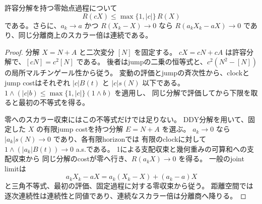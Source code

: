 \begin{lemma}[スカラー倍の連続性]
許容分解を持つ零始点過程について
\[
 R(cX)\le\max\{1,|c|\}\,R(X)
\]
である。さらに、$a_k\to a$ かつ $R(X_k-X)\to0$ なら
$R(a_kX_k-aX)\to0$ であり、同じ分離商上のスカラー倍は連続である。
\end{lemma}
\begin{proof}
分解 $X=N+A$ と二次変分 $[N]$ を固定する。
$cX=cN+cA$ は許容分解で、$[cN]=c^2[N]$ である。
後者はjumpの二乗の恒等式と、$c^2(N^2-[N])$ の局所マルチンゲール性から従う。
変動の評価とjumpの斉次性から、clockとjump costはそれぞれ
$|c|B(t)$ と $|c|s(N)$ 以下である。
$1\wedge(|c|b)\le\max\{1,|c|\}(1\wedge b)$ を適用し、
同じ分解で評価してから下限を取ると最初の不等式を得る。

零へのスカラー収束にはこの不等式だけでは足りない。
DDY分解を用いて、固定した $X$ の有限jump costを持つ分解 $E=N+A$ を選ぶ。
$a_k\to0$ なら $|a_k|s(N)\to0$ であり、各有限horizonでは
有限のclockに対して $1\wedge(|a_k|B(t))\to0$ a.s.である。
1による支配収束と幾何重みの可算和への支配収束から
同じ分解のcostが零へ行き、$R(a_kX)\to0$ を得る。
一般のjoint limitは
\[
 a_kX_k-aX=a_k(X_k-X)+(a_k-a)X
\]
と三角不等式、最初の評価、固定過程に対する零収束から従う。
距離空間では逐次連続性は連続性と同値であり、連続なスカラー倍は分離商へ降りる。
\end{proof}
